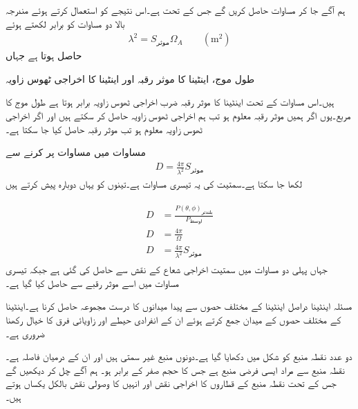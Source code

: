 ہم آگے جا کر مساوات  حاصل کریں گے جس کے تحت   ہے۔اس نتیجے کو استعمال کرتے ہوئے مندرجہ بالا دو مساوات کو برابر لکھتے ہوئے
\begin{align}\label{مساوات_اینٹینا_اخراجی_ٹھوس_زاویہ_موثر_رقبہ_تعلق}
\lambda^2 =S_{\text{موثر}} \Omega_A \quad \quad (\si{\meter \squared})
\end{align}
حاصل ہوتا ہے جہاں
\begin{description}
 طول موج،
  اینٹینا کا موثر رقبہ اور
 اینٹینا کا اخراجی ٹھوس زاویہ
\end{description}
ہیں۔اس مساوات کے تحت اینٹینا کا موثر رقبہ ضرب اخراجی ٹھوس زاویہ برابر ہوتا ہے  طول موج کا مربع۔یوں اگر ہمیں موثر رقبہ معلوم ہو تب ہم اخراجی ٹھوس زاویہ حاصل کر سکتے ہیں اور اگر اخراجی ٹھوس زاویہ معلوم ہو تب موثر رقبہ حاصل کیا جا سکتا ہے۔

مساوات  میں مساوات  پر کرنے سے
\begin{align}
D=\frac{4\pi}{\lambda^2} S_{\text{موثر}}
\end{align}
لکھا جا سکتا ہے۔سمتیت کی یہ تیسری مساوات ہے۔تینوں کو یہاں دوبارہ پیش کرتے ہیں

\begin{gather}
\begin{aligned}
D&=\frac{P(\theta,\phi)_{\text{بلندتر}}}{P_{\text{اوسط}}} \\
D&=\frac{4\pi}{\Omega} \\
D&=\frac{4\pi}{\lambda^2} S_{\text{موثر}}
\end{aligned}
\end{gather}
جہاں پہلی دو مساوات میں سمتیت اخراجی شعاع کے نقش سے حاصل کی گئی ہے جبکہ تیسری مساوات میں اسے موثر رقبے سے حاصل کیا گیا ہے۔

مسئلہ اینٹینا دراصل اینٹینا کے مختلف حصوں سے پیدا میدانوں کا درست مجموعہ حاصل کرنا ہے۔اینٹینا کے مختلف حصوں کے میدان جمع کرتے ہوئے ان کے انفرادی حیطے اور زاویائی فرق کا خیال رکھنا ضروری ہے۔

 دو عدد نقطہ منبع کو شکل میں دکھایا گیا ہے۔دونوں منبع غیر سمتی ہیں اور ان کے درمیان فاصلہ  ہے۔نقطہ منبع سے مراد ایسی فرضی منبع ہے جس کا حجم صفر کے برابر ہو۔ ہم آگے چل کر  دیکھیں گے جس کے تحت نقطہ منبع کے قطاروں کا اخراجی نقش اور انہیں کا وصولی نقش بالکل یکساں ہوتے ہیں۔    

